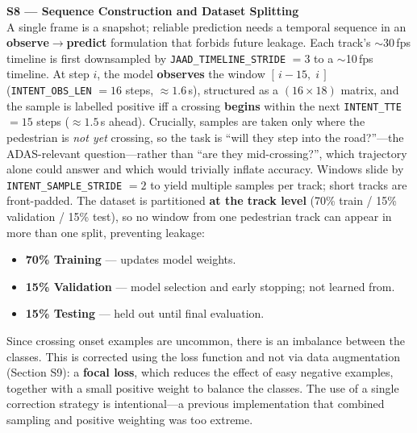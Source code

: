 \documentclass[conference]{IEEEtran}
\begin{document}
\textbf{S8 --- Sequence Construction and Dataset Splitting} \\
A single frame is a snapshot; reliable prediction needs a temporal sequence in an \textbf{observe$\rightarrow$predict} formulation that forbids future leakage. Each track's $\sim$30\,fps timeline is first downsampled by \texttt{JAAD\_TIMELINE\_STRIDE} $= 3$ to a $\sim$10\,fps timeline. At step $i$, the model \textbf{observes} the window $[\,i-15,\;i\,]$ (\texttt{INTENT\_OBS\_LEN} $= 16$ steps, $\approx1.6$\,s), structured as a $(16 \times 18)$ matrix, and the sample is labelled positive iff a crossing \textbf{begins} within the next \texttt{INTENT\_TTE} $= 15$ steps ($\approx1.5$\,s ahead). Crucially, samples are taken only where the pedestrian is \emph{not yet} crossing, so the task is ``will they step into the road?''---the ADAS-relevant question---rather than ``are they mid-crossing?'', which trajectory alone could answer and which would trivially inflate accuracy. Windows slide by \texttt{INTENT\_SAMPLE\_STRIDE} $= 2$ to yield multiple samples per track; short tracks are front-padded.
The dataset is partitioned \textbf{at the track level} (70\% train / 15\% validation / 15\% test), so no window from one pedestrian track can appear in more than one split, preventing leakage:
\begin{itemize}
    \item \textbf{70\% Training} --- updates model weights.
    \item \textbf{15\% Validation} --- model selection and early stopping; not learned from.
    \item \textbf{15\% Testing} --- held out until final evaluation.
\end{itemize}
Since crossing onset examples are uncommon, there is an imbalance between the classes. This is corrected using the loss function and not via data augmentation (Section S9): a \textbf{focal loss}, which reduces the effect of easy negative examples, together with a small positive weight to balance the classes. The use of a single correction strategy is intentional---a previous implementation that combined sampling and positive weighting was too extreme.
\end{document}
